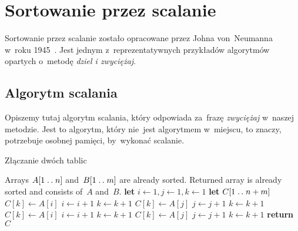 \section{Sortowanie przez scalanie}

Sortowanie przez scalanie zostało opracowane
przez Johna von~Neumanna w~roku 1945~\cite{merge-sort-wiki}.
Jest jednym z~reprezentatywnych przykładów
algorytmów opartych o~metodę \emph{dziel i zwyciężaj}.

\subsection{Algorytm scalania}
Opiszemy tutaj algorytm scalania, który odpowiada 
za~frazę \emph{zwyciężaj} w~naszej metodzie.
Jest to algorytm, który nie~jest algorytmem w~miejscu,
to znaczy, potrzebuje osobnej pamięci, by~wykonać
scalanie.

\begin{algorithm}
    \label{alg:merge}
    \caption{Złączanie dwóch tablic}
    \begin{algorithmic}[1]
        \Require Arrays \( A[1 \mathrel{{.}\,{.}}\nobreak n] \) 
        and~\( B[1 \mathrel{{.}\,{.}}\nobreak m] \) are already sorted.
        \Ensure Returned array is already sorted
            and consists of~\( A \) and~\( B \).
            \State \textbf{let} \( i \gets 1, j \gets 1, k \gets 1 \)
            \State \textbf{let} \( C[1 \mathrel{{.}\,{.}}\nobreak n + m] \) 
             \label{alg:merge:while}
                    \State \( C[k] \gets A[i] \)
                    \State \( i \gets i + 1 \)
                    \State \( k \gets k + 1 \)
                \Else 
                    \State \( C[k] \gets A[j] \)
                    \State \( j \gets j + 1 \)
                    \State \( k \gets k + 1 \)
                \EndIf
            \EndWhile
                \State \( C[k] \gets A[i] \)
                \State \( i \gets i + 1 \)
                \State \( k \gets k + 1 \)
            \EndWhile
                \State \( C[k] \gets A[j] \)
                \State \( j \gets j + 1 \)
                \State \( k \gets k + 1 \)
            \EndWhile
            \State \textbf{return} \( C \)
        \EndProcedure%
    \end{algorithmic}
\end{algorithm}

